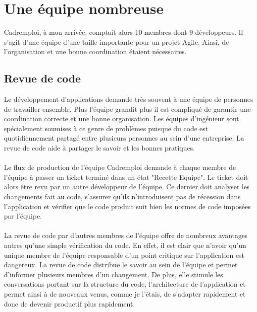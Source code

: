 \section{Une équipe nombreuse}
\label{sec:Une équipe nombreuse}
Cadremploi, à mon arrivée, comptait alors 10 membres dont 9 développeurs.
Il s'agit d'une équipe d'une taille importante pour un projet Agile.
Ainsi, de l'organisation et une bonne coordination étaient nécessaires.

\subsection{Revue de code}
\label{sub:Revue de code}
Le développement d'applications demande très souvent à une équipe de personnes de travailler ensemble.
Plus l'équipe grandit plus il est compliqué de garantir une coordination correcte et une bonne organisation.
Les équipes d'ingénieur sont spécialement soumises à ce genre de problèmes puisque du code est quotidiennement partagé entre plusieurs personnes au sein d'une entreprise.
La revue de code aide à partager le savoir et les bonnes pratiques.
\paragraph{}
Le flux de production de l'équipe Cadremploi demande à chaque membre de l'équipe à passer un ticket terminé dans un état "Recette Equipe".
Le ticket doit alors être revu par un autre développeur de l'équipe.
Ce dernier doit analyser les changements fait au code, s'assurer qu'ils n'introduisent pas de récession dans l'application et vérifier que le code produit suit bien les normes de code imposées par l'équipe.
\paragraph{}
La revue de code par d'autres membres de l'équipe offre de nombreux avantages autres qu'une simple vérification du code.
En effet, il est clair que n'avoir qu'un unique membre de l'équipe responsable d'un point critique sur l'application est dangereux.
La revue de code distribue le savoir au sein de l'équipe et permet d'informer plusieurs membres d'un changement.
De plus, elle stimule les conversations portant sur la structure du code, l'architecture de l'application et permet ainsi à de nouveaux venus, comme je l'étais, de s'adapter rapidement et donc de devenir productif plus rapidement.
